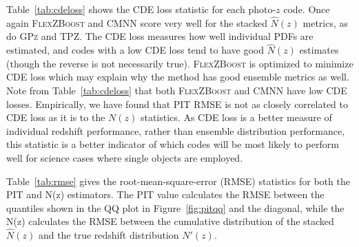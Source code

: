 \documentclass[usenatbib]{mn2e}
\newcommand{\red}[1]{\textcolor{red}{#1}}
\begin{document}
Table~\ref{tab:cdeloss} shows the CDE loss statistic for each photo-$z$ code.  Once again \textsc{FlexZBoost} and \textsc{CMNN} score very well for the stacked $\hat{N}(z)$ metrics, as do \textsc{GPz} and \textsc{TPZ}.  The CDE loss measures how well individual PDFs are estimated, and codes with a low CDE loss tend to have good $\hat{N}(z)$ estimates (though the reverse is not necessarily true). \textsc{FlexZBoost} is optimized to minimize CDE loss which may explain why the method has good ensemble metrics as well. Note from Table~\ref{tab:cdeloss} that both \textsc{FlexZBoost} and \textsc{CMNN} have low CDE losses.  Empirically, we have found that PIT RMSE is not as closely correlated to CDE loss as it is to the $N(z)$ statistics.  As CDE loss is a better measure of individual redshift performance, rather than ensemble distribution performance, this statistic is a better indicator of which codes will be most likely to perform well for science cases where single objects are employed.

Table~\ref{tab:rmse} gives the root-mean-square-error (RMSE) statistics for both the PIT and N(z) estimators.  The PIT value calculates the RMSE between the quantiles shown in the QQ plot in Figure~\ref{fig:pitqq} and the diagonal, while the N(z) calculates the RMSE between the cumulative distribution of the stacked $\hat{N}(z)$ and the true redshift distribution $N'(z)$.  %
\end{document}
